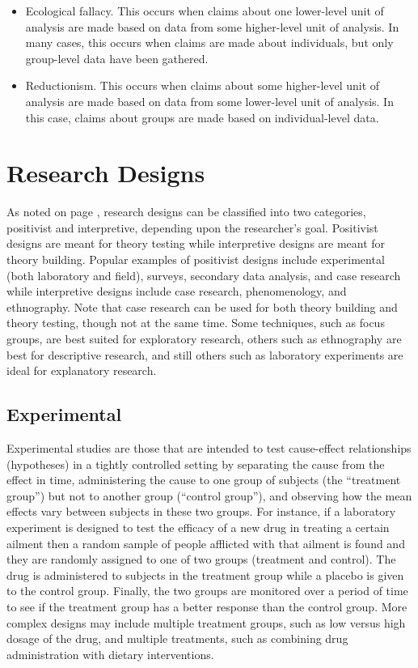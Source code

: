 \begin{itemize}
	\item Ecological fallacy. This occurs when claims about one lower-level unit of analysis are made based on data from some higher-level unit of analysis. In many cases, this occurs when claims are made about individuals, but only group-level data have been gathered. 

	\item Reductionism. This occurs when claims about some higher-level unit of analysis are made based on data from some lower-level unit of analysis. In this case, claims about groups are made based on individual-level data.

\end{itemize}

\section{Research Designs}

As noted on page \pageref{04:process}, research designs can be classified into two categories, positivist and interpretive, depending upon the researcher's goal. Positivist designs are meant for theory testing while interpretive designs are meant for theory building. Popular examples of positivist designs include experimental (both laboratory and field), surveys, secondary data analysis, and case research while interpretive designs include case research, phenomenology, and ethnography. Note that case research can be used for both theory building and theory testing, though not at the same time. Some techniques, such as focus groups, are best suited for exploratory research, others such as ethnography are best for descriptive research, and still others such as laboratory experiments are ideal for explanatory research.

\subsection{Experimental}

Experimental studies are those that are intended to test cause-effect relationships (hypotheses) in a tightly controlled setting by separating the cause from the effect in time, administering the cause to one group of subjects (the ``treatment group'') but not to another group (``control group''), and observing how the mean effects vary between subjects in these two groups. For instance, if a laboratory experiment is designed to test the efficacy of a new drug in treating a certain ailment then a random sample of people afflicted with that ailment is found and they are randomly assigned to one of two groups (treatment and control). The drug is administered to subjects in the treatment group while a placebo is given to the control group. Finally, the two groups are monitored over a period of time to see if the treatment group has a better response than the control group. More complex designs may include multiple treatment groups, such as low versus high dosage of the drug, and multiple treatments, such as combining drug administration with dietary interventions. 

